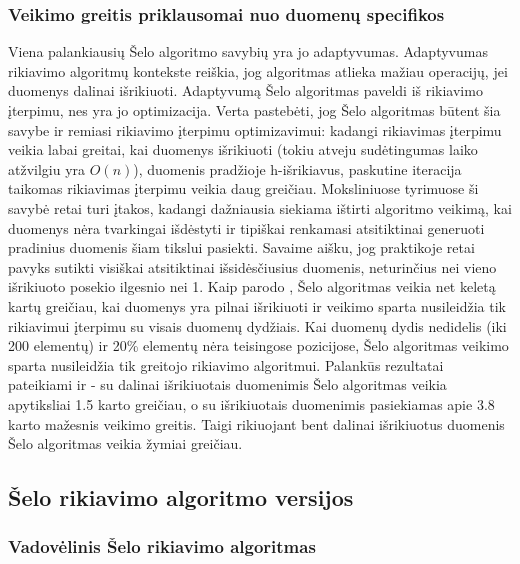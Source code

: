 \documentclass{VUMIFInfKursinis}
\begin{document}
\subsubsection{Veikimo greitis priklausomai nuo duomenų specifikos}

Viena palankiausių Šelo algoritmo savybių yra jo adaptyvumas.
Adaptyvumas rikiavimo algoritmų kontekste reiškia, jog algoritmas atlieka mažiau operacijų, jei duomenys dalinai išrikiuoti.
Adaptyvumą Šelo algoritmas paveldi iš rikiavimo įterpimu, nes yra jo optimizacija.
Verta pastebėti, jog Šelo algoritmas būtent šia savybe ir remiasi rikiavimo įterpimu optimizavimui:
kadangi rikiavimas įterpimu veikia labai greitai, kai duomenys išrikiuoti (tokiu atveju sudėtingumas laiko atžvilgiu yra $O(n)$),
duomenis pradžioje h-išrikiavus, paskutine iteracija taikomas rikiavimas įterpimu veikia daug greičiau.
Moksliniuose tyrimuose ši savybė retai turi įtakos, kadangi dažniausia siekiama ištirti algoritmo veikimą, kai duomenys
nėra tvarkingai išdėstyti ir tipiškai renkamasi atsitiktinai generuoti pradinius duomenis šiam tikslui pasiekti.
Savaime aišku, jog praktikoje retai pavyks sutikti visiškai atsitiktinai išsidėsčiusius duomenis, neturinčius nei vieno išrikiuoto posekio ilgesnio nei 1.
Kaip parodo \cite{10.1145/359024.359026}, Šelo algoritmas veikia net keletą kartų greičiau, kai duomenys yra pilnai
išrikiuoti ir veikimo sparta nusileidžia tik rikiavimui įterpimu su visais duomenų dydžiais.
Kai duomenų dydis nedidelis (iki 200 elementų) ir 20\% elementų nėra teisingose pozicijose, Šelo algoritmas veikimo sparta nusileidžia tik greitojo rikiavimo algoritmui.
Palankūs rezultatai pateikiami ir \cite{7280062} - su dalinai išrikiuotais duomenimis Šelo algoritmas veikia apytiksliai 1.5 karto greičiau, o su išrikiuotais
duomenimis pasiekiamas apie 3.8 karto mažesnis veikimo greitis.
Taigi rikiuojant bent dalinai išrikiuotus duomenis Šelo algoritmas veikia žymiai greičiau.



\subsection{Šelo rikiavimo algoritmo versijos}

\subsubsection{Vadovėlinis Šelo rikiavimo algoritmas}
\end{document}
